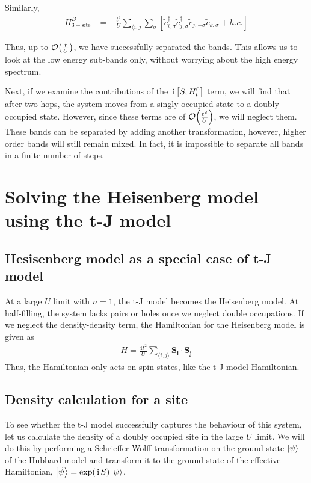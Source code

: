 \documentclass[]{report}
\renewcommand{\vec}{\bm}
\newcommand{\I}{\,\mathrm{i}\,}
\begin{document}
Similarly,
\begin{align}
\nonumber
H^{B}_{\mathrm{3-site}} &= 
-\frac{t^2}{U} \sum_{\langle i,j } \sum_\sigma \left[ \tilde{c}^{\dagger}_{i, \sigma} \tilde{c}^{\dagger}_{j, \sigma} \tilde{c}_{j, -\sigma} \tilde{c}_{k, \sigma} + h.c. \right]
\end{align}

Thus, up to $ \order{\frac{t}{U}} $, we have successfully separated the bands. This allows us to look at the low energy sub-bands only, without worrying about the high energy spectrum.

Next, if we examine the contributions of the $ \I \comm{S}{H^{0}_{t}} $ term, we will find that after two hops, the system moves from a singly occupied state to a doubly occupied state. However, since these terms are of $ \order{\frac{t^2}{U}} $, we will neglect them. These bands can be separated by adding another transformation, however, higher order bands will still remain mixed. In fact, it is impossible to separate all bands in a finite number of steps.

\chapter{Solving the Heisenberg model using the t-J model}
\section{Hesisenberg model as a special case of t-J model}
At a large $ U $ limit with $ n = 1 $, the t-J model becomes the Heisenberg model. At half-filling, the system lacks pairs or holes once we neglect double occupations. If we neglect the density-density term, the Hamiltonian for the Heisenberg model is given as
\begin{align}
H = \frac{4t^2}{U} \sum_{\langle i,j \rangle} \vec{S_{i}} \cdot \vec{S_{j}}
\end{align}
Thus, the Hamiltonian only acts on spin states, like the t-J model Hamiltonian.

\section{Density calculation for a site}
To see whether the t-J model successfully captures the behaviour of this system, let us calculate the density of a doubly occupied site in the large $ U $ limit. We will do this by performing a Schrieffer-Wolff transformation on the ground state $ \ket{\psi} $ of the Hubbard model and transform it to the ground state of the effective Hamiltonian, $ \ket{\tilde{\psi}} = \exp(\I S) \ket{\psi} $.
\end{document}
